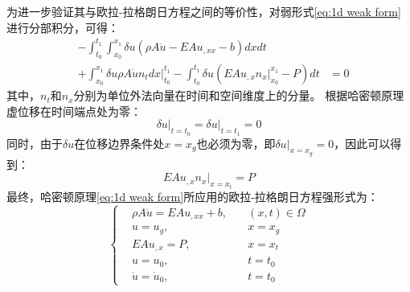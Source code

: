 为进一步验证其与欧拉-拉格朗日方程之间的等价性，对弱形式\eqref{eq:1d weak form}进行分部积分，可得：
\begin{equation}
    \begin{aligned}
        & - \int_{t_0}^{t_1} \int_{x_0}^{x_1} \delta u (\rho A \ddot u - EA u_{,xx} - b) dx dt \\
        & + \int_{x_0}^{x_1} \delta u \rho A \dot u n_t dx \vert_{t_0}^{t_1}
        - \int_{t_0}^{t_1} \delta u (EA u_{,x} n_x \vert_{x_0}^{x_1} - P) dt
        &= 0
    \end{aligned}
\end{equation}
其中，$n_t$和$n_x$分别为单位外法向量在时间和空间维度上的分量。
根据哈密顿原理虚位移在时间端点处为零：
\begin{equation}\label{eq:1d_virtual_BC}
    \delta u\vert_{t=t_0} = \delta u\vert_{t=t_1} = 0
\end{equation}
同时，由于$\delta u$在位移边界条件处$x=x_g$也必须为零，即$\delta u\vert_{x=x_g}=0$，因此可以得到：
\begin{equation}
    EA u_{,x} n_x \vert_{x=x_t} = P
\end{equation}
最终，哈密顿原理\eqref{eq:1d weak form}所应用的欧拉-拉格朗日方程强形式为：
\begin{equation}\label{eq:djx}
    \left \{
    \begin{aligned}
        &\rho A \ddot u = EA u_{,xx} + b, \quad & (x,t) \in \Omega \\
        &u = u_g, \quad & x=x_g  \\
        &EA u_{,x} = P ,\quad & x=x_t \\
        &u = u_0,\quad & t=t_0 \\
        &\dot u = \dot u_0,\quad & t=t_0
    \end{aligned}
    \right .
\end{equation}

